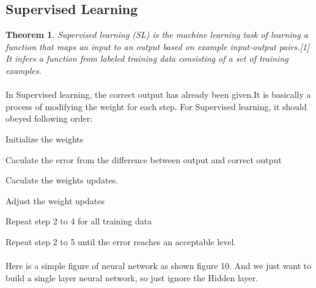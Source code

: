 \documentclass[a4paper,12pt]{article}
\newtheorem{theorem}{Theorem}[section]
\begin{document}
\begin{spacing}{2}
\subsection{Supervised Learning}
\begin{theorem}
Supervised learning (SL) is the machine learning task of learning a function that maps an input to an output based on example input-output pairs.[1] It infers a function from labeled training data consisting of a set of training examples.
\end{theorem}
\paragraph{ }In Supervised learning, the correct output has already been given.It is basically a process of   modifying the weight for each step. For Supervised learning, it should obeyed following order:
\begin{steps}
  \item Initialize the weights
  \item Caculate the error from the difference between output and correct output
  \item Caculate the weights updates.
  \item Adjust the weight updates
  \item Repeat step 2 to 4 for all training data
  \item Repeat step 2 to 5 until the error reaches an acceptable level.\\
\end{steps}
\paragraph{ }Here is a simple figure of neural network as shown figure 10. And we just want to build a single layer neural network, so just ignore the Hidden layer.
\begin{center}

\end{center}
\end{spacing}
\end{document}
